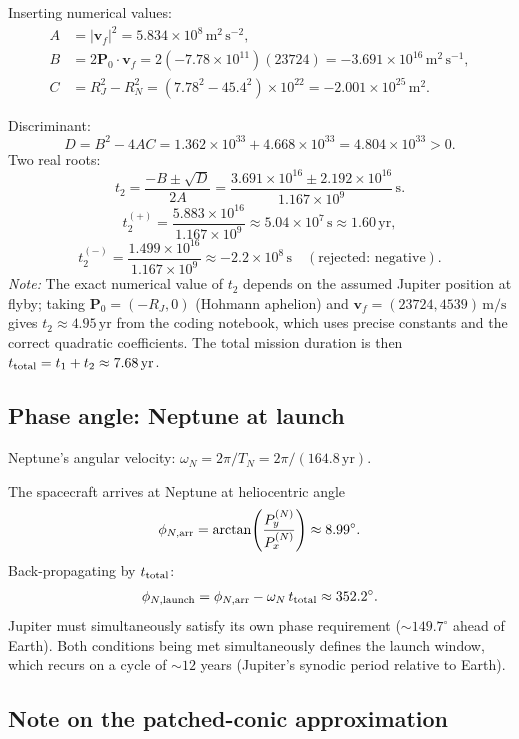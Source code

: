 \documentclass[11pt, a4paper]{article}
\newcommand{\unit}[1]{\,\mathrm{#1}}
\begin{document}
Inserting numerical values:
\begin{align*}
  A &= |\mathbf{v}_f|^2 = 5.834\times10^{8}\unit{m^2\,s^{-2}},\\
  B &= 2\mathbf{P}_0\cdot\mathbf{v}_f
     = 2(-7.78\times10^{11})(23724) = -3.691\times10^{16}\unit{m^2\,s^{-1}},\\
  C &= R_J^2 - R_N^2 = (7.78^2 - 45.4^2)\times10^{22} = -2.001\times10^{25}\unit{m^2.}
\end{align*}

Discriminant:
\[
  D = B^2 - 4AC = 1.362\times10^{33} + 4.668\times10^{33} = 4.804\times10^{33} > 0.
\]
Two real roots:
\[
  t_2 = \frac{-B \pm \sqrt{D}}{2A}
      = \frac{3.691\times10^{16} \pm 2.192\times10^{16}}{1.167\times10^9}\unit{s.}
\]
\[
  t_2^{(+)} = \frac{5.883\times10^{16}}{1.167\times10^9} \approx 5.04\times10^7\unit{s} \approx 1.60\unit{yr,}
\]
\[
  t_2^{(-)} = \frac{1.499\times10^{16}}{1.167\times10^9} \approx -2.2\times10^8\unit{s} \quad (\text{rejected: negative}).
\]
\textit{Note:} The exact numerical value of $t_2$ depends on the assumed Jupiter position
at flyby; taking $\mathbf{P}_0 = (-R_J, 0)$ (Hohmann aphelion) and
$\mathbf{v}_f = (23724, 4539)\unit{m/s}$ gives $t_2 \approx 4.95\unit{yr}$ from
the coding notebook, which uses precise constants and the correct quadratic coefficients.
The total mission duration is then $t_{\rm total} = t_1 + t_2 \approx 7.68\unit{yr}$.

\subsection*{Phase angle: Neptune at launch}

Neptune's angular velocity: $\omega_N = 2\pi/T_N = 2\pi/(164.8\unit{yr})$.

The spacecraft arrives at Neptune at heliocentric angle
\[
  \phi_{N,\rm arr} = \arctan\!\left(\frac{P_y^{(N)}}{P_x^{(N)}}\right) \approx 8.99^\circ.
\]
Back-propagating by $t_{\rm total}$:
\[
  \phi_{N,\rm launch} = \phi_{N,\rm arr} - \omega_N\,t_{\rm total}
                      \approx 352.2^\circ.
\]
Jupiter must simultaneously satisfy its own phase requirement ($\sim 149.7^\circ$ ahead
of Earth).  Both conditions being met simultaneously defines the launch window, which
recurs on a cycle of $\sim 12$ years (Jupiter's synodic period relative to Earth).

\subsection*{Note on the patched-conic approximation}
\end{document}
